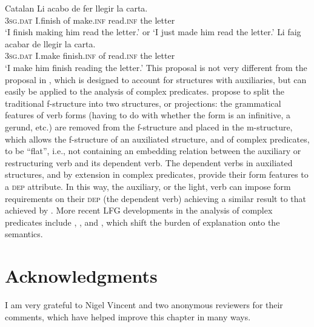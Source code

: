 \documentclass[output=paper,hidelinks]{langscibook}
\begin{document}
\ea\label{ex:Romance:59} Catalan \citep{Alsina1997}
\ea\label{ex:Romance:59a}
\gll Li acabo de fer llegir la carta.\\
       \textsc{3sg.dat} I.finish of make.\textsc{inf} read.\textsc{inf} the letter\\
\glt   `I finish making him read the letter.' or `I just made him read the letter.'
\ex\label{ex:Romance:59b}
\gll
 Li faig acabar de llegir la carta.\\
       \textsc{3sg.dat} I.make finish.\textsc{inf} of read.\textsc{inf} the letter\\
\glt   `I make him finish reading the letter.'\z\z
This proposal is not very different from the proposal in \citet{buttetal96}, which is designed to account for structures with auxiliaries, but can easily be applied to the analysis of complex predicates. \citet{buttetal96} propose to split the traditional f-structure into two structures, or projections: the grammatical features of verb forms (having to do with whether the form is an infinitive, a gerund, etc.) are removed from the f-structure and placed in the m-structure, which allows the f-structure of an auxiliated structure, and of complex predicates, to be ``flat'', i.e., not containing an embedding relation between the auxiliary or restructuring verb and its dependent verb. The dependent verbs in auxiliated structures, and by extension in complex predicates, provide their form features to a \textsc{dep} attribute. In this way, the auxiliary, or the light, verb can impose form requirements on their \textsc{dep} (the dependent verb) achieving a similar result to that achieved by \citet{AndrewsManning1999}. More recent LFG developments in the analysis of complex predicates include \citet{Andrews2007}, \citet{HomolaColer2013}, and \citet{Lowe2015}, which shift the burden of explanation onto the semantics.

\section*{Acknowledgments}

I am very grateful to Nigel Vincent and two anonymous reviewers for their comments, which have helped improve this chapter in many ways.

\sloppy
\printbibliography[heading=subbibliography,notkeyword=this]
\end{document}
